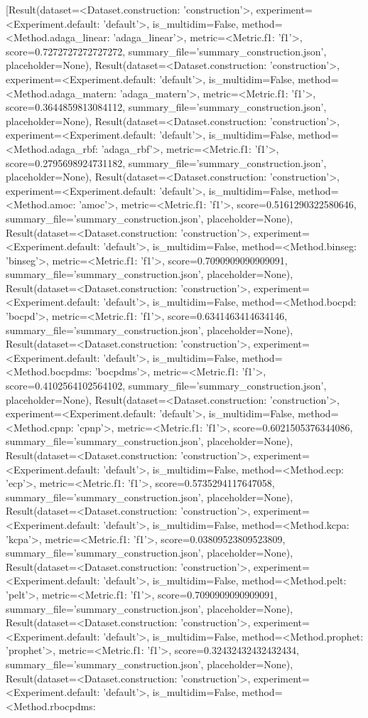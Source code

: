 [Result(dataset=<Dataset.construction: 'construction'>, experiment=<Experiment.default: 'default'>, is_multidim=False, method=<Method.adaga_linear: 'adaga_linear'>, metric=<Metric.f1: 'f1'>, score=0.7272727272727272, summary_file='summary_construction.json', placeholder=None), Result(dataset=<Dataset.construction: 'construction'>, experiment=<Experiment.default: 'default'>, is_multidim=False, method=<Method.adaga_matern: 'adaga_matern'>, metric=<Metric.f1: 'f1'>, score=0.3644859813084112, summary_file='summary_construction.json', placeholder=None), Result(dataset=<Dataset.construction: 'construction'>, experiment=<Experiment.default: 'default'>, is_multidim=False, method=<Method.adaga_rbf: 'adaga_rbf'>, metric=<Metric.f1: 'f1'>, score=0.2795698924731182, summary_file='summary_construction.json', placeholder=None), Result(dataset=<Dataset.construction: 'construction'>, experiment=<Experiment.default: 'default'>, is_multidim=False, method=<Method.amoc: 'amoc'>, metric=<Metric.f1: 'f1'>, score=0.5161290322580646, summary_file='summary_construction.json', placeholder=None), Result(dataset=<Dataset.construction: 'construction'>, experiment=<Experiment.default: 'default'>, is_multidim=False, method=<Method.binseg: 'binseg'>, metric=<Metric.f1: 'f1'>, score=0.7090909090909091, summary_file='summary_construction.json', placeholder=None), Result(dataset=<Dataset.construction: 'construction'>, experiment=<Experiment.default: 'default'>, is_multidim=False, method=<Method.bocpd: 'bocpd'>, metric=<Metric.f1: 'f1'>, score=0.6341463414634146, summary_file='summary_construction.json', placeholder=None), Result(dataset=<Dataset.construction: 'construction'>, experiment=<Experiment.default: 'default'>, is_multidim=False, method=<Method.bocpdms: 'bocpdms'>, metric=<Metric.f1: 'f1'>, score=0.4102564102564102, summary_file='summary_construction.json', placeholder=None), Result(dataset=<Dataset.construction: 'construction'>, experiment=<Experiment.default: 'default'>, is_multidim=False, method=<Method.cpnp: 'cpnp'>, metric=<Metric.f1: 'f1'>, score=0.6021505376344086, summary_file='summary_construction.json', placeholder=None), Result(dataset=<Dataset.construction: 'construction'>, experiment=<Experiment.default: 'default'>, is_multidim=False, method=<Method.ecp: 'ecp'>, metric=<Metric.f1: 'f1'>, score=0.5735294117647058, summary_file='summary_construction.json', placeholder=None), Result(dataset=<Dataset.construction: 'construction'>, experiment=<Experiment.default: 'default'>, is_multidim=False, method=<Method.kcpa: 'kcpa'>, metric=<Metric.f1: 'f1'>, score=0.03809523809523809, summary_file='summary_construction.json', placeholder=None), Result(dataset=<Dataset.construction: 'construction'>, experiment=<Experiment.default: 'default'>, is_multidim=False, method=<Method.pelt: 'pelt'>, metric=<Metric.f1: 'f1'>, score=0.7090909090909091, summary_file='summary_construction.json', placeholder=None), Result(dataset=<Dataset.construction: 'construction'>, experiment=<Experiment.default: 'default'>, is_multidim=False, method=<Method.prophet: 'prophet'>, metric=<Metric.f1: 'f1'>, score=0.32432432432432434, summary_file='summary_construction.json', placeholder=None), Result(dataset=<Dataset.construction: 'construction'>, experiment=<Experiment.default: 'default'>, is_multidim=False, method=<Method.rbocpdms: 